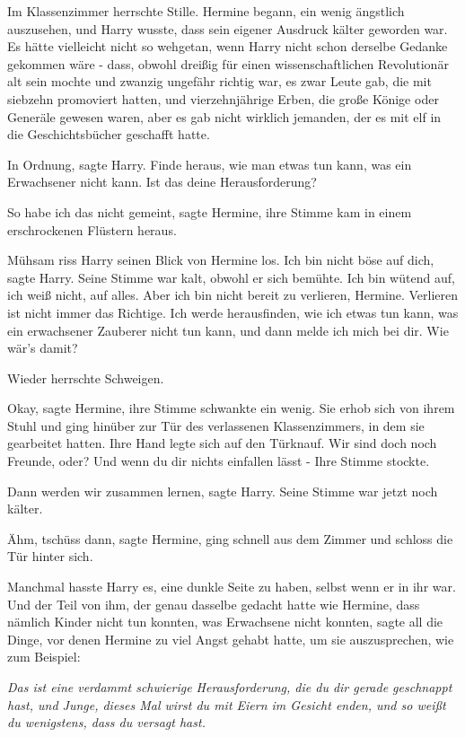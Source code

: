 Im Klassenzimmer herrschte Stille. Hermine begann, ein wenig ängstlich
auszusehen, und Harry wusste, dass sein eigener Ausdruck kälter geworden war. Es
hätte vielleicht nicht so wehgetan, wenn Harry nicht schon derselbe Gedanke
gekommen wäre - dass, obwohl dreißig für einen wissenschaftlichen Revolutionär
alt sein mochte und zwanzig ungefähr richtig war, es zwar Leute gab, die mit
siebzehn promoviert hatten, und vierzehnjährige Erben, die große Könige oder
Generäle gewesen waren, aber es gab nicht wirklich jemanden, der es mit elf in
die Geschichtsbücher geschafft hatte.

\glqq In Ordnung\grqq{}, sagte Harry. \glqq Finde heraus, wie man etwas tun
kann, was ein Erwachsener nicht kann. Ist das deine Herausforderung?\grqq{}

\glqq So habe ich das nicht gemeint\grqq{}, sagte Hermine, ihre Stimme kam in
einem erschrockenen Flüstern heraus.

Mühsam riss Harry seinen Blick von Hermine los. \glqq Ich bin nicht böse auf
dich\grqq{}, sagte Harry. Seine Stimme war kalt, obwohl er sich bemühte. \glqq
Ich bin wütend auf, ich weiß nicht, auf alles. Aber ich bin nicht bereit zu
verlieren, Hermine. Verlieren ist nicht immer das Richtige. Ich werde
herausfinden, wie ich etwas tun kann, was ein erwachsener Zauberer nicht tun
kann, und dann melde ich mich bei dir. Wie wär's damit?\grqq{}

Wieder herrschte Schweigen.

\glqq Okay\grqq{}, sagte Hermine, ihre Stimme schwankte ein wenig. Sie erhob
sich von ihrem Stuhl und ging hinüber zur Tür des verlassenen Klassenzimmers, in
dem sie gearbeitet hatten. Ihre Hand legte sich auf den Türknauf. \glqq Wir sind
doch noch Freunde, oder? Und wenn du dir nichts einfallen lässt -\grqq{} Ihre
Stimme stockte.

\glqq Dann werden wir zusammen lernen\grqq{}, sagte Harry. Seine Stimme war
jetzt noch kälter.

\glqq Ähm, tschüss dann\grqq{}, sagte Hermine, ging schnell aus dem Zimmer und
schloss die Tür hinter sich.

Manchmal hasste Harry es, eine dunkle Seite zu haben, selbst wenn er in ihr war.
Und der Teil von ihm, der genau dasselbe gedacht hatte wie Hermine, dass nämlich
Kinder nicht tun konnten, was Erwachsene nicht konnten, sagte all die Dinge, vor
denen Hermine zu viel Angst gehabt hatte, um sie auszusprechen, wie zum
Beispiel:

\emph{Das ist eine verdammt schwierige Herausforderung, die du dir gerade
geschnappt hast, und Junge, dieses Mal wirst du mit Eiern im Gesicht enden,
und so weißt du wenigstens, dass du versagt hast.}

